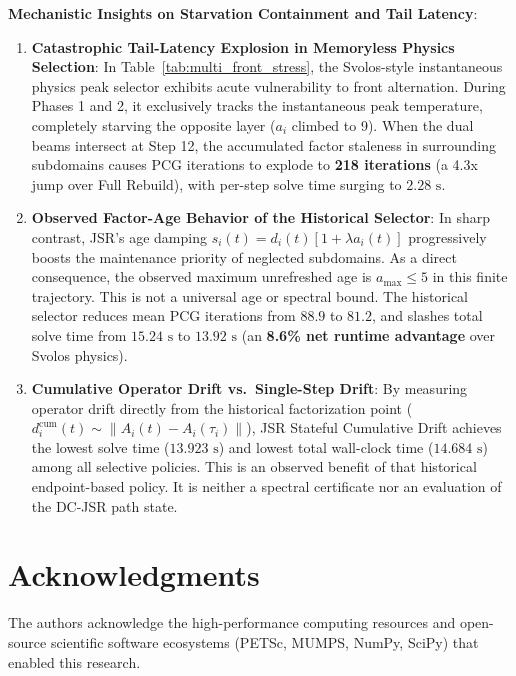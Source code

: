 \documentclass[preprint,12pt,3p]{elsarticle}
\begin{document}
\textbf{Mechanistic Insights on Starvation Containment and Tail Latency}:
\begin{enumerate}
    \item \textbf{Catastrophic Tail-Latency Explosion in Memoryless Physics Selection}:
    In Table~\ref{tab:multi_front_stress}, the Svolos-style instantaneous physics peak selector exhibits acute vulnerability to front alternation. During Phases 1 and 2, it exclusively tracks the instantaneous peak temperature, completely starving the opposite layer ($a_i$ climbed to 9). When the dual beams intersect at Step 12, the accumulated factor staleness in surrounding subdomains causes PCG iterations to explode to \textbf{218 iterations} (a 4.3x jump over Full Rebuild), with per-step solve time surging to $2.28\text{ s}$.
    \item \textbf{Observed Factor-Age Behavior of the Historical Selector}:
    In sharp contrast, JSR's age damping $s_i(t) = d_i(t) [1 + \lambda a_i(t)]$ progressively boosts the maintenance priority of neglected subdomains. As a direct consequence, the observed maximum unrefreshed age is \textbf{$a_{\text{max}} \le 5$} in this finite trajectory. This is not a universal age or spectral bound. The historical selector reduces mean PCG iterations from $88.9$ to $81.2$, and slashes total solve time from $15.24\text{ s}$ to $13.92\text{ s}$ (an \textbf{8.6\% net runtime advantage} over Svolos physics).
    \item \textbf{Cumulative Operator Drift vs.\ Single-Step Drift}:
    By measuring operator drift directly from the historical factorization point ($d_i^{\text{cum}}(t) \sim \|A_i(t) - A_i(\tau_i)\|$), JSR Stateful Cumulative Drift achieves the lowest solve time ($13.923\text{ s}$) and lowest total wall-clock time ($14.684\text{ s}$) among all selective policies. This is an observed benefit of that historical endpoint-based policy. It is neither a spectral certificate nor an evaluation of the DC-JSR path state.
\end{enumerate}


\clearpage
\section*{Acknowledgments}
The authors acknowledge the high-performance computing resources and open-source scientific software ecosystems (PETSc, MUMPS, NumPy, SciPy) that enabled this research.
\end{document}
